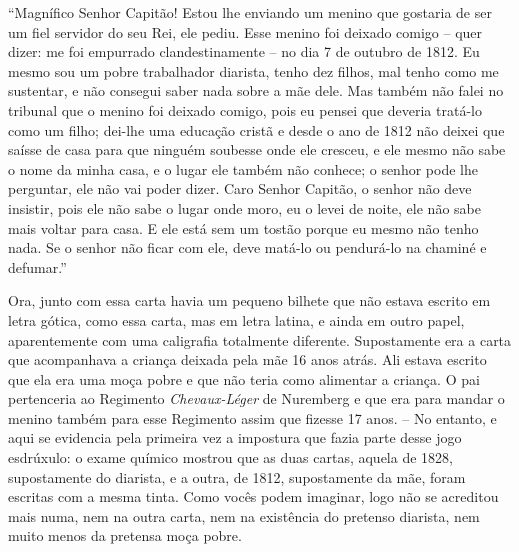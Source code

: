 ``Magnífico Senhor Capitão! Estou lhe enviando um menino que gostaria de
ser um fiel servidor do seu Rei, ele pediu. Esse menino foi deixado
comigo -- quer dizer: me foi empurrado clandestinamente -- no dia 7 de
outubro de 1812. Eu mesmo sou um pobre trabalhador diarista, tenho dez
filhos, mal tenho como me sustentar, e não consegui saber nada sobre a
mãe dele. Mas também não falei no tribunal que o menino foi deixado
comigo, pois eu pensei que deveria tratá-lo como um filho; dei-lhe uma
educação cristã e desde o ano de 1812 não deixei que saísse de casa para
que ninguém soubesse onde ele cresceu, e ele mesmo não sabe o nome da
minha casa, e o lugar ele também não conhece; o senhor pode lhe
perguntar, ele não vai poder dizer. Caro Senhor Capitão, o senhor não
deve insistir, pois ele não sabe o lugar onde moro, eu o levei de noite,
ele não sabe mais voltar para casa. E ele está sem um tostão porque eu
mesmo não tenho nada. Se o senhor não ficar com ele, deve matá-lo ou
pendurá-lo na chaminé e defumar.''

Ora, junto com essa carta havia um pequeno bilhete que não estava
escrito em letra gótica, como essa carta, mas em letra latina, e ainda
em outro papel, aparentemente com uma caligrafia totalmente diferente.
Supostamente era a carta que acompanhava a criança deixada pela mãe 16
anos atrás. Ali estava escrito que ela era uma moça pobre e que não
teria como alimentar a criança. O pai pertenceria ao Regimento
\emph{Chevaux-Léger} de Nuremberg e que era para mandar o menino também
para esse Regimento assim que fizesse 17 anos. -- No entanto, e aqui se
evidencia pela primeira vez a impostura que fazia parte desse jogo
esdrúxulo: o exame químico mostrou que as duas cartas, aquela de 1828,
supostamente do diarista, e a outra, de 1812, supostamente da mãe, foram
escritas com a mesma tinta. Como vocês podem imaginar, logo não se
acreditou mais numa, nem na outra carta, nem na existência do pretenso
diarista, nem muito menos da pretensa moça pobre.

